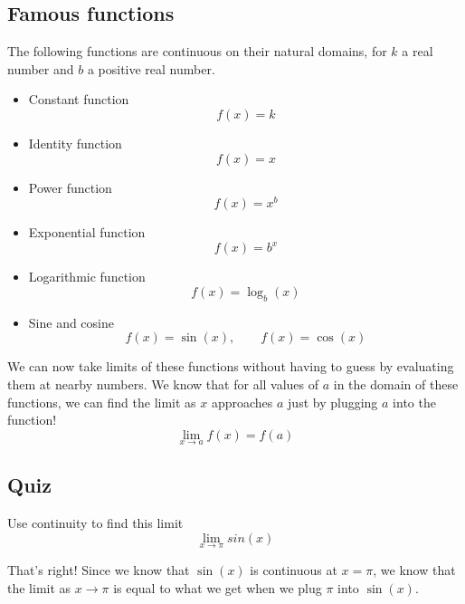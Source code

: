 \documentclass{ximera}
\begin{document}
\subsection{Famous functions}

\begin{theorem}
    The following functions are continuous on their natural domains, for $k$ a real number and $b$ a positive real number.
    \begin{itemize}
        \item Constant function \[f(x)=k\]
        \item Identity function \[f(x)=x\]
        \item Power function \[f(x)=x^b\]
        \item Exponential function \[f(x)=b^x\]
        \item Logarithmic function \[f(x)=\log_b(x)\]
        \item Sine and cosine \[f(x)=\sin(x), \qquad f(x) = \cos(x)\]
    \end{itemize}
\end{theorem}

We can now take limits of these functions without having to guess by evaluating them at nearby numbers. We know that for all values of $a$ in the domain of these functions, we can find the limit as $x$ approaches $a$ just by plugging $a$ into the function!
\[
    \lim_{x \to a} f(x) = f(a)
\]

\subsection{Quiz}

\begin{question}
Use continuity to find this limit \[ \lim_{x \to \pi} sin(x) \]
\begin{multipleChoice}  
\end{multipleChoice}  

\begin{explanation}
    That's right! Since we know that $\sin(x)$ is continuous at $x = \pi$, we know that the limit as $x \to \pi$ is equal to what we get when we plug $\pi$ into $\sin(x)$.
\end{explanation}
\end{question}
\end{document}
